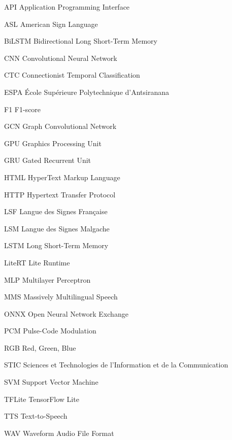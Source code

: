 \begin{listofabbr}[4cm]
\item [API] Application Programming Interface
\item [ASL] American Sign Language
\item [BiLSTM] Bidirectional Long Short-Term Memory
\item [CNN] Convolutional Neural Network
\item [CTC] Connectionist Temporal Classification
\item [ESPA] École Supérieure Polytechnique d'Antsiranana
\item [F1] F1-score
\item [GCN] Graph Convolutional Network
\item [GPU] Graphics Processing Unit
\item [GRU] Gated Recurrent Unit
\item [HTML] HyperText Markup Language
\item [HTTP] Hypertext Transfer Protocol
\item [LSF] Langue des Signes Française
\item [LSM] Langue des Signes Malgache
\item [LSTM] Long Short-Term Memory
\item [LiteRT] Lite Runtime
\item [MLP] Multilayer Perceptron
\item [MMS] Massively Multilingual Speech
\item [ONNX] Open Neural Network Exchange
\item [PCM] Pulse-Code Modulation
\item [RGB] Red, Green, Blue
\item [STIC] Sciences et Technologies de l'Information et de la Communication
\item [SVM] Support Vector Machine
\item [TFLite] TensorFlow Lite
\item [TTS] Text-to-Speech
\item [WAV] Waveform Audio File Format
\end{listofabbr}
